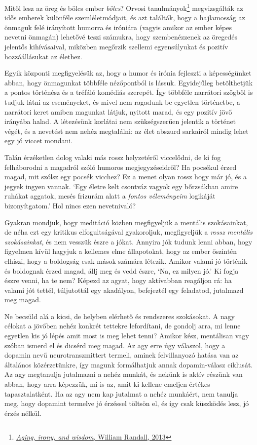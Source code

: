 Mitől lesz az öreg és bölcs ember \emph{bölcs}? Orvosi
tanulmányok\footnote{\href{https://www.researchgate.net/publication/258190619_Aging_irony_and_wisdom_On_the_narrative_psychology_of_later_life}{\emph{Aging,
  irony, and wisdom}, William Randall, 2013}} megvizsgálták az idős
emberek különféle szemléletmódjait, és azt találták, hogy a hajlamosság
az önmaguk felé irányított humorra és iróniára (vagyis amikor az ember
képes nevetni önmagán) lehetővé teszi számukra, hogy szembenézzenek az
öregedés jelentős kihívásaival, miközben megőrzik szellemi egyensúlyukat
és pozitív hozzáállásukat az élethez.

Egyik központi megfigyelésük az, hogy a humor és irónia fejleszti a
képességünket abban, hogy önmagunkat többféle nézőpontból is lássuk.
Egyidejűleg betölthetjük a pontos történész és a tréfáló komédiás
szerepét. Így többféle narrátori szögből is tudjuk látni az eseményeket,
és mivel nem ragadunk be egyetlen történetbe, a narrátori keret amiben
magunkat látjuk, nyitott marad, és egy pozitív jövő irányába halad. A
létezésünk korlátai nem szükségszerűen jelentik a történet végét, és a
nevetést nem nehéz megtalálni: az élet abszurd sarkairól mindig lehet
egy jó viccet mondani.

Talán érzéketlen dolog valaki más rossz helyzetéről viccelődni, de ki
fog felháborodni a magadról szóló humoros megjegyzéseidről? Ha pocsékul
érzed magad, mit szólsz egy pocsék vicchez? Ez a menet olyan rossz hogy
már jó, és a jegyek ingyen vannak. `Egy életre kelt csontváz vagyok egy
bőrzsákban amire ruhákat aggatok, mesés frizurám alatt a \emph{fontos
véleményeim} logikáját bizonyítgatom.' Hol nincs ezen nevetnivaló?

Gyakran mondjuk, hogy meditáció közben megfigyeljük a mentális
szokásainkat, de néha ezt egy kritikus elfogultságával gyakoroljuk,
megfigyeljük a \emph{rossz mentális szokásainkat}, és nem vesszük észre
a jókat. Annyira jók tudunk lenni abban, hogy figyelmen kívül hagyjuk a
kellemes elme állapotokat, hogy az ember őszintén elhiszi, hogy a
boldogság csak mások számára létezik. Amikor valami jó történik és
boldognak érzed magad, állj meg és vedd észre, `Na, ez milyen jó.' Ki
fogja észre venni, ha te nem? Képezd az agyat, hogy aktívabban reagáljon
rá: ha valami jót tettél, túljutottál egy akadályon, befejeztél egy
feladatod, jutalmazd meg magad.

Ne becsüld alá a kicsi, de helyben elérhető és rendszeres szokásokat. A
nagy célokat a jövőben nehéz konkrét tettekre lefordítani, de gondolj
arra, mi lenne egyetlen kis jó lépés amit most is meg lehet tenni?
Amikor kész, mentálisan vagy szóban ismerd el és dicsérd meg magad. Az
agy erre úgy válaszol, hogy a dopamin nevű neurotranszmittert termeli,
aminek felvillanyozó hatása van az általános közérzetünkre, így magunk
formálhatjuk annak dopamin-válasz ciklusát. Az agy megtanulja jutalmazni
a nehéz munkát, és nekünk is aktív részünk van abban, hogy arra
képezzük, mi is az, amit ki kellene emeljen értékes tapasztalatként. Ha
az agy nem kap jutalmat a nehéz munkáért, nem tanulja meg, hogy dopamint
termelve jó érzéssel töltsön el, és így csak küszködés lesz, jó érzés
nélkül.

